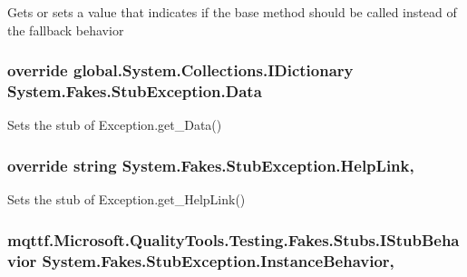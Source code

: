 Gets or sets a value that indicates if the base method should be called instead of the fallback behavior

\hypertarget{class_system_1_1_fakes_1_1_stub_exception_ab81d299caef356889c678d102532efda}{
\subsubsection[{Data}]{\setlength{\rightskip}{0pt plus 5cm}override global.\-System.\-Collections.\-I\-Dictionary System.\-Fakes.\-Stub\-Exception.\-Data\hspace{0.3cm}{\ttfamily [get]}}}\label{class_system_1_1_fakes_1_1_stub_exception_ab81d299caef356889c678d102532efda}


Sets the stub of Exception.\-get\-\_\-\-Data()

\hypertarget{class_system_1_1_fakes_1_1_stub_exception_a84faab3b7942353d443b91748ace1328}{
\subsubsection[{Help\-Link}]{\setlength{\rightskip}{0pt plus 5cm}override string System.\-Fakes.\-Stub\-Exception.\-Help\-Link\hspace{0.3cm}{\ttfamily [get]}, {\ttfamily [set]}}}\label{class_system_1_1_fakes_1_1_stub_exception_a84faab3b7942353d443b91748ace1328}


Sets the stub of Exception.\-get\-\_\-\-Help\-Link()

\hypertarget{class_system_1_1_fakes_1_1_stub_exception_aff6f35b94035b955201d3e7cae28bae4}{
\subsubsection[{Instance\-Behavior}]{\setlength{\rightskip}{0pt plus 5cm}mqttf.\-Microsoft.\-Quality\-Tools.\-Testing.\-Fakes.\-Stubs.\-I\-Stub\-Behavior System.\-Fakes.\-Stub\-Exception.\-Instance\-Behavior\hspace{0.3cm}{\ttfamily [get]}, {\ttfamily [set]}}}\label{class_system_1_1_fakes_1_1_stub_exception_aff6f35b94035b955201d3e7cae28bae4}


